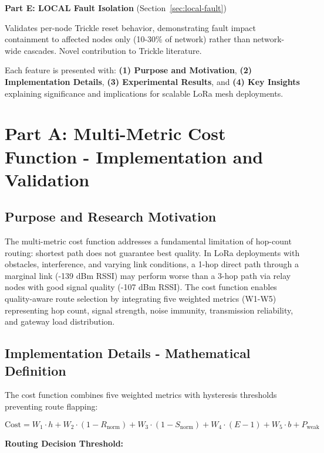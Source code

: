 \textbf{Part E: LOCAL Fault Isolation} (Section~\ref{sec:local-fault})

Validates per-node Trickle reset behavior, demonstrating fault impact containment to affected nodes only (10-30\% of network) rather than network-wide cascades. Novel contribution to Trickle literature.

Each feature is presented with: \textbf{(1) Purpose and Motivation}, \textbf{(2) Implementation Details}, \textbf{(3) Experimental Results}, and \textbf{(4) Key Insights} explaining significance and implications for scalable LoRa mesh deployments.

\section{Part A: Multi-Metric Cost Function - Implementation and Validation}
\label{sec:multi-metric}

\subsection{Purpose and Research Motivation}

The multi-metric cost function addresses a fundamental limitation of hop-count routing: shortest path does not guarantee best quality. In LoRa deployments with obstacles, interference, and varying link conditions, a 1-hop direct path through a marginal link (-139 dBm RSSI) may perform worse than a 3-hop path via relay nodes with good signal quality (-107 dBm RSSI). The cost function enables quality-aware route selection by integrating five weighted metrics (W1-W5) representing hop count, signal strength, noise immunity, transmission reliability, and gateway load distribution.

\subsection{Implementation Details - Mathematical Definition}

The cost function combines five weighted metrics with hysteresis thresholds preventing route flapping:

\begin{equation}
\text{Cost} = W_1 \cdot h + W_2 \cdot (1 - R_{\text{norm}}) + W_3 \cdot (1 - S_{\text{norm}}) + W_4 \cdot (E - 1) + W_5 \cdot b + P_{\text{weak}}
\label{eq:cost-function}
\end{equation}

\textbf{Routing Decision Threshold:}

